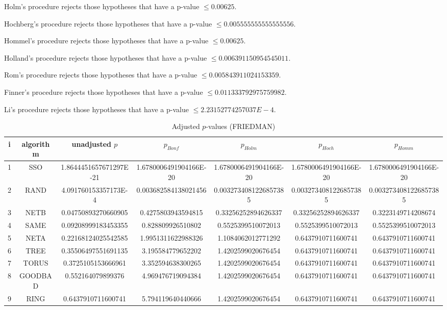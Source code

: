 \documentclass[a4paper,10pt]{article}
\begin{document}
\begin{landscape}
Holm's procedure rejects those hypotheses that have a p-value $\le0.00625$.


Hochberg's procedure rejects those hypotheses that have a p-value $\le0.005555555555555556$.


Hommel's procedure rejects those hypotheses that have a p-value $\le0.00625$.


Holland's procedure rejects those hypotheses that have a p-value $\le0.006391150954545011$.


Rom's procedure rejects those hypotheses that have a p-value $\le0.005843911024153359$.


Finner's procedure rejects those hypotheses that have a p-value $\le0.011333792975759982$.


Li's procedure rejects those hypotheses that have a p-value $\le2.23152774257037E-4$.



\newpage

\begin{table}[!htp]
\centering\scriptsize
\caption{Adjusted $p$-values (FRIEDMAN)}
\begin{tabular}{ccccccc}
i&algorithm&unadjusted $p$&$p_{Bonf}$&$p_{Holm}$&$p_{Hoch}$&$p_{Homm}$\\
\hline
1& SSO&1.8644451657671297E-21&1.6780006491904166E-20&1.6780006491904166E-20&1.6780006491904166E-20&1.6780006491904166E-20\\
2& RAND&4.091760153357173E-4&0.003682584138021456&0.0032734081226857385&0.0032734081226857385&0.0032734081226857385\\
3& NETB&0.04750893270660905&0.4275803943594815&0.33256252894626337&0.33256252894626337&0.3223149714208674\\
4& SAME&0.09208999183453355&0.828809926510802&0.5525399510072013&0.5525399510072013&0.5525399510072013\\
5& NETA&0.22168124025542585&1.9951311622988326&1.1084062012771292&0.6437910711600741&0.6437910711600741\\
6& TREE&0.35506497551691135&3.195584779652202&1.4202599020676454&0.6437910711600741&0.6437910711600741\\
7& TORUS&0.3725105153666961&3.352594638300265&1.4202599020676454&0.6437910711600741&0.6437910711600741\\
8& GOODBAD&0.552164079899376&4.969476719094384&1.4202599020676454&0.6437910711600741&0.6437910711600741\\
9& RING&0.6437910711600741&5.794119640440666&1.4202599020676454&0.6437910711600741&0.6437910711600741\\
\hline
\end{tabular}
\end{table}


\end{landscape}
\end{document}
